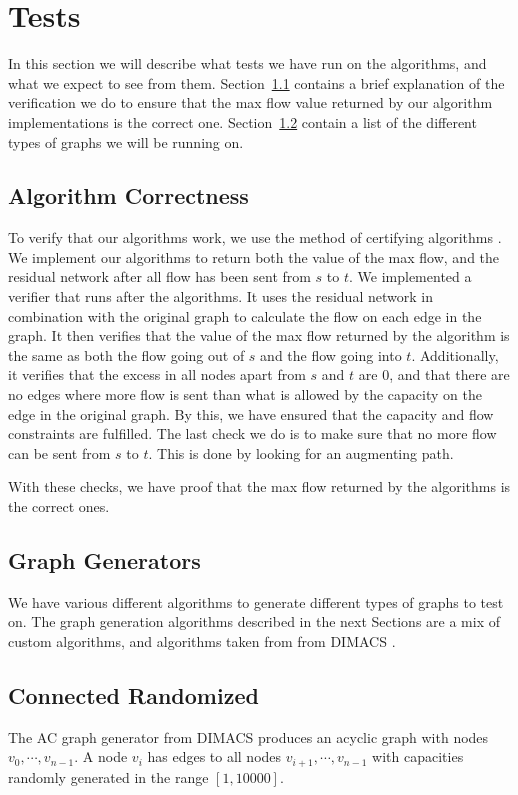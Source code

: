\section{Tests}
\label{TestsSection}
In this section we will describe what tests we have run on the algorithms, and what we expect to see from them.
Section~\ref{AlgCorrectness} contains a brief explanation of the verification we do to ensure that the max flow value returned by our algorithm implementations is the correct one.
Section~\ref{GraphGenerators} contain a list of the different types of graphs we will be running on.


\subsection{Algorithm Correctness}
\label{AlgCorrectness}
To verify that our algorithms work, we use the method of certifying algorithms \cite{McConnell10certifyingalgorithms}.
We implement our algorithms to return both the value of the max flow, and the residual network after all flow has been sent from $s$ to $t$.
We implemented a verifier that runs after the algorithms. It uses the residual network in combination with the original graph to calculate the flow on each edge in the graph.
It then verifies that the value of the max flow returned by the algorithm is the same as both the flow going out of $s$ and the flow going into $t$.
Additionally, it verifies that the excess in all nodes apart from $s$ and $t$ are $0$, and that there are no edges where more flow is sent than what is allowed by the capacity on the edge in the original graph.
By this, we have ensured that the capacity and flow constraints are fulfilled. The last check we do is to make sure that no more flow can be sent from $s$ to $t$. This is done by looking for an augmenting path.

With these checks, we have proof that the max flow returned by the algorithms is the correct ones.
    
\subsection{Graph Generators}
\label{GraphGenerators}
We have various different algorithms to generate different types of graphs to test on.
The graph generation algorithms described in the next Sections are a mix of custom algorithms, and algorithms taken from from DIMACS \cite{Johnson:1993:NFM:562474}.

\subsection{Connected Randomized}
\label{ACGraphsSection}
The AC graph generator from DIMACS produces an acyclic graph with nodes $v_0, \cdots, v_{n-1}$. A node $v_i$ has edges to all nodes $v_{i+1}, \cdots, v_{n-1}$ 
with capacities randomly generated in the range $[1, 10000]$.


